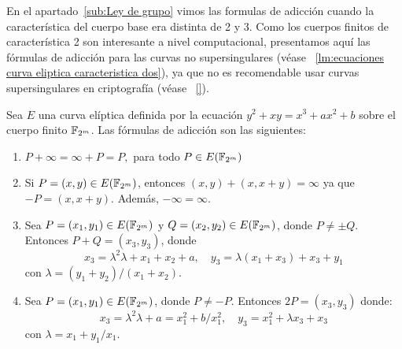 En el apartado~\ref{sub:Ley de grupo} vimos las formulas de adicción cuando la característica del cuerpo base era distinta de 2 y 3. Como los cuerpos finitos de característica 2 son interesante a nivel computacional, presentamos aquí las fórmulas de adicción para las curvas no supersingulares (véase ~\ref{lm:ecuaciones curva eliptica caracteristica dos}), ya que no es recomendable usar curvas supersingulares en criptografía (véase ~\ref{}).

\begin{formulasadiccion}
Sea $E$ una curva elíptica definida por la ecuación $y^2 + x y = x^3 + a x^2 + b$ sobre el cuerpo finito $\mathbb{F}_{2^m}$. Las fórmulas de adicción son las siguientes:
	\begin{enumerate}[label=\alph*)]
	   \item $P + \infty = \infty + P = P,$ para todo $P \in E(\mathbb{F}_{2^m})$
	   \item Si $P = (x, y) \in E(\mathbb{F}_{2^m})$, entonces $(x, y) + (x, x + y) = \infty$ ya que $-P = (x, x + y)$. Además, $- \infty = \infty$.
	   \item Sea $P = (x_1, y_1) \in E(\mathbb{F}_{2^m})$ y $Q = (x_2, y_2) \in E(\mathbb{F}_{2^m})$, donde $P \neq \pm Q$. Entonces $P + Q = (x_3, y_3)$, donde
	   $$
	   x_3 = \lambda^2 \lambda + x_1 + x_2 + a, \quad
	   y_3 = \lambda (x_1 + x_3) + x_3 + y_1
	   $$
	   con $\lambda = (y_1 + y_2)/(x_1 + x_2)$.
	   \item Sea $P = (x_1, y_1) \in E(\mathbb{F}_{2^m})$, donde $P \neq -P$. Entonces $2 P = (x_3, y_3)$ donde:
	   $$
	   x_3 = \lambda^2 \lambda + a = x_1^2 + b/x_1^2, \quad
	   y_3 = x_1^2 + \lambda x_3 + x_3
	   $$
	   con $\lambda = x_1 + y_1/x_1$.
	\end{enumerate}
\end{formulasadiccion}

